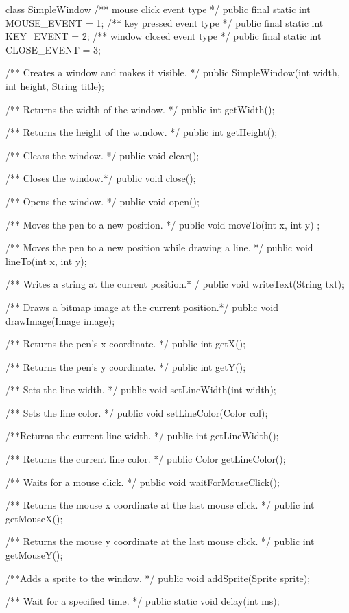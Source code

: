 \begin{JavaSpec}{class SimpleWindow}
    /** mouse click event type */
	public final static int MOUSE\_EVENT = 1;
    /** key pressed event type */
	public final static int KEY\_EVENT = 2;
    /** window closed event type */
	public final static int CLOSE\_EVENT = 3;
    
	/** Creates a window and makes it visible. */
	public SimpleWindow(int width, int height, String title);

	/** Returns the width of the window. */
	public int getWidth();

	/** Returns the height of the window. */
	public int getHeight();

	/** Clears the window. */
	public void clear();

	/** Closes the window.*/
	public void close();

	/** Opens the window. */
	public void open(); 

	/** Moves the pen to a new position. */
	public void moveTo(int x, int y) ;

	/** Moves the pen to a new position while drawing a line. */
	public void lineTo(int x, int y);

	/** Writes a string at the current position.* /
	public void writeText(String txt);
	
	/** Draws a bitmap image at the current position.*/
	public void drawImage(Image image);

	/** Returns the pen's x coordinate. */
	public int getX();

	/** Returns the pen's y coordinate. */
	public int getY();

	/** Sets the line width.  */
	public void setLineWidth(int width);

	/** Sets the line color. */
	public void setLineColor(Color col);

	/**Returns the current line width. */
	public int getLineWidth();

	/** Returns the current line color. */
	public Color getLineColor();
	
	/**  Waits for a mouse click. */
	public void waitForMouseClick();

	/** Returns the mouse x coordinate at the last mouse click. */
	public int getMouseX();

	/** Returns the mouse y coordinate at the last mouse click. */
	public int getMouseY();

	/**Adds a sprite to the window. */
	public void addSprite(Sprite sprite);

	/** Wait for a specified time. */
	public static void delay(int ms);


\end{JavaSpec}

